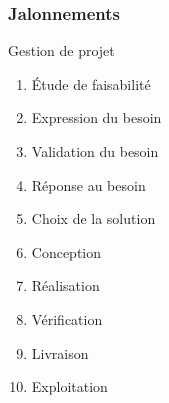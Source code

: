 \begin{frame}
	\frametitle{Jalonnements}
	\begin{block}{Gestion de projet}
		\begin{enumerate}
			\item Étude de faisabilité
			\item Expression du besoin
			\item Validation du besoin
			\item Réponse au besoin
			\item Choix de la solution
			\item Conception
			\item Réalisation
			\item Vérification
			\item Livraison
			\item Exploitation
		\end{enumerate}
	\end{block}
\end{frame}

